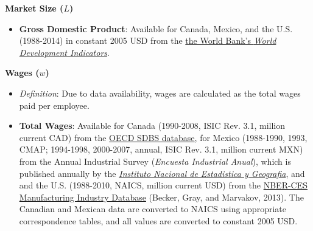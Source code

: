 \documentclass[11pt]{article}
\begin{document}
\begin{spacing}{1}
\begin{itemize}
	\end{itemize}	


\noindent \textbf{Market Size ($L$)}
	\begin{itemize}
	
	\item \textbf{Gross Domestic Product}: Available for Canada, Mexico, and the U.S. (1988-2014) in constant 2005 USD from the \href{http://data.worldbank.org/data-catalog/world-development-indicators}{the World Bank's \emph{World Development Indicators}}.
		
	\end{itemize}	
	
\noindent \textbf{Wages ($w$)}
	\begin{itemize}
	
	\item \emph{Definition}: Due to data availability, wages are calculated as the total wages paid per employee.

	\item \textbf{Total Wages}: Available for Canada (1990-2008, ISIC Rev. 3.1, million current CAD) from the \href{http://stats.oecd.org/index.aspx?queryid=224}{OECD SDBS database}, for Mexico (1988-1990, 1993, CMAP; 1994-1998, 2000-2007, annual, ISIC Rev. 3.1, million current MXN) from the Annual Industrial Survey (\emph{Encuesta Industrial Anual}), which is published annually by   the \href{http://buscador.inegi.org.mx/search?q=encuesta+industrial+anual&client=ProductosR&proxystylesheet=ProductosR&num=10&getfields=*&sort=meta:edicion:D:E:::D&entsp=a__inegi_politica_p72&lr=lang_es\%7Clang_en&oe=UTF-8&ie=UTF-8&ip=10.210.100.253&entqr=3&filter=0&site=ProductosBuscador&tlen=260&ulang=en&start=0}{\emph{Instituto Nacional de Estadistica y Geografia}}, and and the U.S. (1988-2010, NAICS, million current USD) from the \href{http://www.nber.org/nberces/}{NBER-CES Manufacturing Industry Database} (Becker, Gray, and Marvakov, 2013). The Canadian and Mexican data are converted to NAICS using appropriate correspondence tables, and all values are converted to constant 2005 USD. 
		
	\end{itemize}	



\end{spacing}
\end{document}
